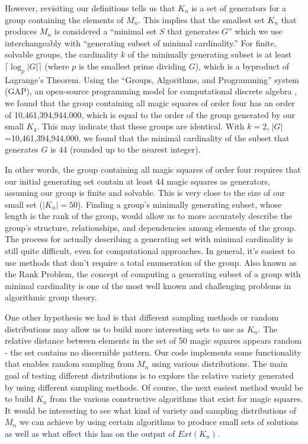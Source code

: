 \documentclass[12pt]{report}
\begin{document}
\par However, revisiting our definitions tells us that $K_n$ is a set of generators for a group
containing the elements of $M_n$. This implies that the smallest set $K_n$ that produces $M_n$ is
considered a ``minimal set $S$ that generates $G$'' which we  use interchangeably with ``generating
subset of minimal cardinality.'' For finite, solvable groups, the cardinality $k$ of the minimally
generating subset is at least $\lceil\log_{p}{\left|G\right|}\rceil$ (where $p$ is the smallest
prime dividing $G$), which is a byproduct of Lagrange's Theorem. Using the ``Groups, Algorithms,
and Programming'' system (GAP), an open-source programming model for computational discrete algebra
, we found that the group containing all magic squares of order four has an order of
10,461,394,944,000, which is equal to the order of the group generated by our small $K_4$. This may
indicate that these groups are identical. With $k=2$, $\left|G\right|$=10,461,394,944,000, we found
that the minimal cardinality of the subset that generates $G$ is 44 (rounded up to the nearest
integer).

\par In other words, the group containing all magic squares of order four requires that our initial
generating set contain at least 44 magic squares as generators, assuming our group is finite and
solvable. This is very close to the size of our small set ($\left|K_n\right|=50$). Finding a
group's minimally generating subset, whose length is the rank of the group, would allow us to more
accurately describe the group's structure, relationships, and dependencies among elements of the
group. The process for actually describing a generating set with minimal cardinality is still quite
difficult, even for computational approaches. In general, it's easiest to use methods that don't
require a total enumeration of the group. Also known as the Rank Problem, the concept of computing
a generating subset of a group with minimal cardinality is one of the most well known and
challenging problems in algorithmic group theory.

\par One other hypothesis we had is that different sampling methods or random distributions may
allow us to build more interesting sets to use as $K_n$. The relative distance between elements in
the set of 50 magic squares appears random \hyphen{} the set contains no discernible pattern. Our
code implements some functionality that enables random sampling from $M_n$ using various
distributions. The main goal of testing different distributions is to explore the relative variety
generated by using different sampling methods. Of course, the next easiest method would be to build
$K_n$ from the various constructive algorithms that exist for magic squares. It would be
interesting to see what kind of variety and sampling distributions of $M_n$ we can achieve by using
certain algorithms to produce small sets of solutions as well as what effect this has on the output
of $Ext\left(K_n\right)$.
\end{document}
